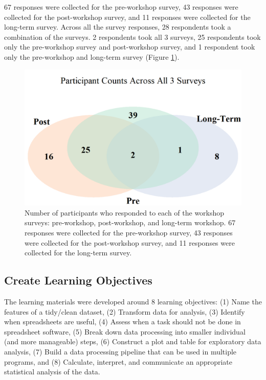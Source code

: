 \documentclass[030-workshop.tex]{subfiles}
\begin{document}
    67 responses were collected for the pre-workshop survey,
    43 responses were collected for the post-workshop survey, and
    11 responses were collected for the long-term survey.
    Across all the survey responses,
    28 respondents took a combination of the surveys.
    2 respondents took all 3 surveys,
    25 respondents took only the pre-workshop survey and post-workshop survey, and
    1 respondent took only the pre-workshop and long-term survey
    (Figure \ref{fig:pre-post-long-response-counts}).

    \begin{figure}[!hbtp]
        \centering
        \includegraphics[]{figs/030-logitudinal/pre-post-long-response-counts}
        \caption[Response rates across all surveys (pre, post, long-term)]
        {Number of participants who responded to each of the workshop surveys:
         pre-workshop, post-workshop, and long-term workshop.
         67 responses were collected for the pre-workshop survey,
         43 responses were collected for the post-workshop survey, and
         11 responses were collected for the long-term survey.
        }
        \label{fig:pre-post-long-response-counts}
    \end{figure}

    \subsection{Create Learning Objectives}

        The learning materials were developed around 8 learning objectives:
        (1) Name the features of a tidy/clean dataset,
        (2) Transform data for analysis,
        (3) Identify when spreadsheets are useful,
        (4) Assess when a task should not be done in spreadsheet software,
        (5) Break down data processing into smaller individual (and more manageable) steps,
        (6) Construct a plot and table for exploratory data analysis,
        (7) Build a data processing pipeline that can be used in multiple programs, and
        (8) Calculate, interpret, and communicate an appropriate statistical analysis of the data.
\end{document}
